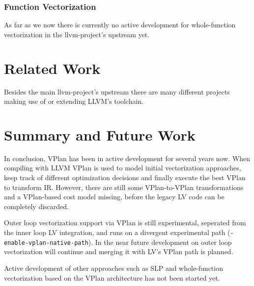 \documentclass[sigplan,11pt,nonacm]{acmart}
\begin{document}
\subsubsection{Function Vectorization}
As far as we now there is currently no active development for whole-function vectorization in the
llvm-project's upstream yet.




\section{Related Work}
\label{sec:relatedwork}
Besides the main llvm-project's upstream there are many different projects making use of or extending
LLVM's toolchain. 



\section{Summary and Future Work}
\label{sec:summary}
In conclusion, VPlan has been in active development for several years now. When compiling with
LLVM VPlan is used to model initial vectorization approaches, keep track of different
optimization decisions and finally execute the best VPlan to transform IR. 
However, there are still some VPlan-to-VPlan transformations and a VPlan-based cost model missing, 
before the legacy LV code can be completely discarded.

Outer loop vectorization support via VPlan is still experimental, seperated from the inner loop
LV integration, and runs on a divergent experimental path (\texttt{-enable-\allowbreak vplan-\allowbreak native-\allowbreak path}).
In the near future development on outer loop vectorization will continue and merging it with LV's
VPlan path is planned.

Active development of other approaches such as SLP and whole-function vectorization based on the 
VPlan architecture has not been started yet.
\end{document}
